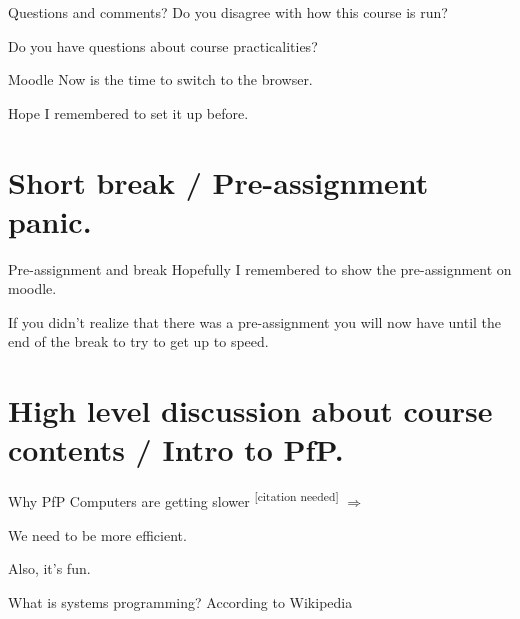 \documentclass[11pt, aspectratio=169, table]{beamer}
\begin{document}
\begin{frame}{Questions and comments?}
\setlength\parskip{\fill}
Do you disagree with how this course is run?

Do you have questions about course practicalities?
\end{frame}

\begin{frame}{Moodle}
\setlength\parskip{\fill}
Now is the time to switch to the browser.

Hope I remembered to set it up before.
\end{frame}

\section{Short break / Pre-assignment panic.}
\begin{frame}{Pre-assignment and break}
\setlength\parskip{\fill}
Hopefully I remembered to show the pre-assignment on moodle.

If you didn't realize that there was a pre-assignment you will now have until the end of the break to try to get up to speed.
\end{frame}

\section{High level discussion about course contents / Intro to PfP.}
\begin{frame}{Why PfP}
\setlength\parskip{\fill}
\pause
Computers are getting slower \textsuperscript{[citation needed]} $\Rightarrow$

We need to be more \alert{efficient}.

Also, it's fun.
\end{frame}

\begin{frame}{What is systems programming?}
\setlength\parskip{\fill}
\pause
According to Wikipedia

\end{frame}
\end{document}
